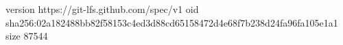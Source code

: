 version https://git-lfs.github.com/spec/v1
oid sha256:02a182488bb82f58153c4ed3d88cd65158472d4e68f7b238d24fa96fa105e1a1
size 87544
